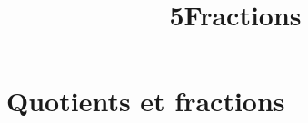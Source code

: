 \documentclass[12pt,a4paper]{article}
\date{}
\title{\textcircled{{\normalsize{5}}}Fractions}
\begin{document}
	\maketitle








\vspace{-0.5cm}

\section{Quotients et fractions}



%
%

%
%
%
%
%
%

%
\end{document}
